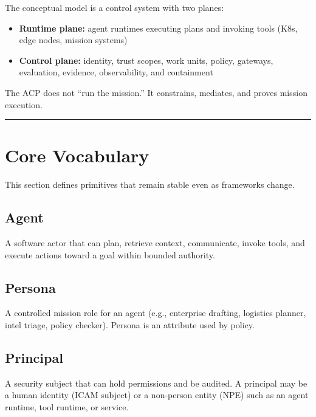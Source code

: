 \documentclass[11pt]{article}
\begin{document}
The conceptual model is a control system with two planes:

\begin{itemize}
\tightlist
\item
  \textbf{Runtime plane:} agent runtimes executing plans and invoking
  tools (K8s, edge nodes, mission systems)
\item
  \textbf{Control plane:} identity, trust scopes, work units, policy,
  gateways, evaluation, evidence, observability, and containment
\end{itemize}

The ACP does not ``run the mission.'' It constrains, mediates, and
proves mission execution.

\vspace{2pt}\begin{center}\rule{0.62\linewidth}{0.6pt}\end{center}\vspace{2pt}

\hypertarget{core-vocabulary}{%
\section{Core Vocabulary}\label{core-vocabulary}}

This section defines primitives that remain stable even as frameworks
change.

\hypertarget{agent}{%
\subsection{Agent}\label{agent}}

A software actor that can plan, retrieve context, communicate, invoke
tools, and execute actions toward a goal within bounded authority.

\hypertarget{persona}{%
\subsection{Persona}\label{persona}}

A controlled mission role for an agent (e.g., enterprise drafting,
logistics planner, intel triage, policy checker). Persona is an
attribute used by policy.

\hypertarget{principal}{%
\subsection{Principal}\label{principal}}

A security subject that can hold permissions and be audited. A principal
may be a human identity (ICAM subject) or a non-person entity (NPE) such
as an agent runtime, tool runtime, or service.
\end{document}
